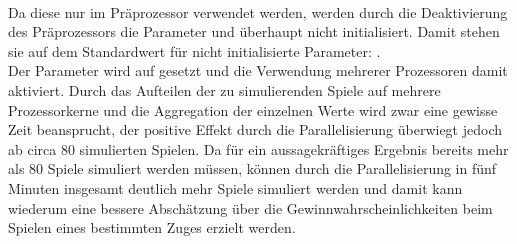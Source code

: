 \\Da diese nur im Präprozessor verwendet werden, werden durch die Deaktivierung des Präprozessors die Parameter  und  überhaupt nicht initialisiert. Damit stehen sie auf dem Standardwert für nicht initialisierte Parameter: .
\\Der Parameter  wird auf  gesetzt und die Verwendung mehrerer Prozessoren damit aktiviert. Durch das Aufteilen der zu simulierenden Spiele auf mehrere Prozessorkerne und die Aggregation der einzelnen Werte wird zwar eine gewisse Zeit beansprucht, der positive Effekt durch die Parallelisierung überwiegt jedoch ab circa 80 simulierten Spielen. Da für ein aussagekräftiges Ergebnis bereits mehr als 80 Spiele simuliert werden müssen, können durch die Parallelisierung in fünf Minuten insgesamt deutlich mehr Spiele simuliert werden und damit kann wiederum eine bessere Abschätzung über die Gewinnwahrscheinlichkeiten beim Spielen eines bestimmten Zuges erzielt werden.
\newpage
